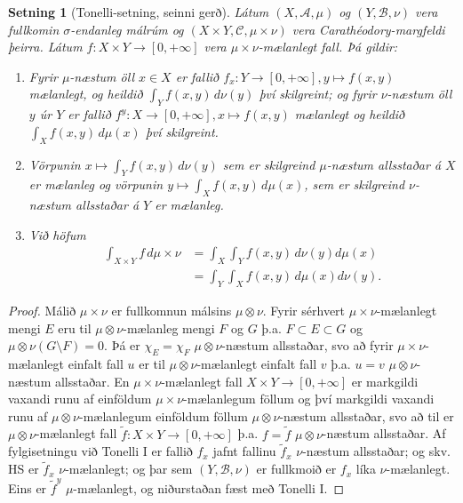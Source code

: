 \documentclass[a4paper,icelandic,11pt]{book}
\theoremstyle{plain}      \newtheorem{setn}{Setning}[chapter]
\theoremstyle{definition} \newtheorem{skilgr}[setn]{Skilgreining}
\theoremstyle{remark}     \newtheorem*{ath}{Athugasemd}
\begin{document}
\begin{setn}
  [Tonelli-setning, seinni gerð]
  Látum $(X,\mathcal A,\mu)$ og $(Y,\mathcal B,\nu)$ vera fullkomin
  $\sigma$-endanleg málrúm og $(X\times Y,\mathcal C, \mu\times\nu)$
  vera Carathéodory-margfeldi þeirra. Látum $f:X\times
  Y\to[0,+\infty]$ vera $\mu\times\nu$-mælanlegt fall. Þá gildir:
  \begin{enumerate}[(1)]
  \item Fyrir $\mu$-næstum öll $x\in X$ er fallið
    $f_{x}:Y\to[0,+\infty],y\mapsto f(x,y)$ mælanlegt, og heildið
    $\int_{Y}f(x,y)\,d\nu(y)$ því skilgreint; og fyrir $\nu$-næstum
    öll $y$ úr $Y$ er fallið $f^{y}:X\to[0,+\infty],x\mapsto f(x,y)$
    mælanlegt og heildið $\int_{X}f(x,y)\,d\mu(x)$ því skilgreint.
  \item Vörpunin $x\mapsto\int_{Y}f(x,y)\,d\nu(y)$ sem er skilgreind
    $\mu$-næstum allsstaðar á $X$ er mælanleg og vörpunin
    $y\mapsto\int_{X}f(x,y)\,d\mu(x)$, sem er skilgreind $\nu$-næstum
    allsstaðar á $Y$ er mælanleg.
  \item Við höfum 
    \begin{align*}
      \int_{X\times Y}f\,d\mu\times\nu
      &= \int_{X}\int_{Y}f(x,y)\,d\nu(y) d\mu(x)
      \\
      &= \int_{Y}\int_{X}f(x,y)\,d\mu(x) d\nu(y).
    \end{align*}
  \end{enumerate}
\end{setn}
\begin{proof}
  Málið $\mu\times\nu$ er fullkomnun málsins $\mu\otimes\nu$. Fyrir
  sérhvert $\mu\times\nu$-mælanlegt mengi $E$ eru til
  $\mu\otimes\nu$-mælanleg mengi $F$ og $G$ þ.a. $F\subset E\subset G$
  og $\mu\otimes\nu(G\setminus F) = 0$. Þá er $\chi_{E} = \chi_{F}$
  $\mu\otimes\nu$-næstum allsstaðar, svo að fyrir
  $\mu\times\nu$-mælanlegt einfalt fall $u$ er til
  $\mu\otimes\nu$-mælanlegt einfalt fall $v$ þ.a. $u=v$
  $\mu\otimes\nu$-næstum allsstaðar. En $\mu\times\nu$-mælanlegt fall
  $X\times Y\to[0,+\infty]$ er markgildi vaxandi runu af einföldum
  $\mu\times\nu$-mælanlegum föllum og því markgildi vaxandi runu af
  $\mu\otimes\nu$-mælanlegum einföldum föllum $\mu\otimes\nu$-næstum
  allsstaðar, svo að til er $\mu\otimes\nu$-mælanlegt fall $\tilde
  f:X\times Y\to[0,+\infty]$ þ.a. $f=\tilde f$ $\mu\otimes\nu$-næstum
  allsstaðar. Af fylgisetningu við Tonelli I er fallið $f_{x}$ jafnt
  fallinu $\tilde f_{x}$ $\nu$-næstum allsstaðar; og skv. HS er
  $\tilde f_{x}$ $\nu$-mælanlegt; og þar sem $(Y,\mathcal B,\nu)$ er
  fullkmoið er $f_{x}$ líka $\nu$-mælanlegt. Eins er $\tilde f^{y}$
  $\mu$-mælanlegt, og niðurstaðan fæst með Tonelli I.
\end{proof}
\end{document}
